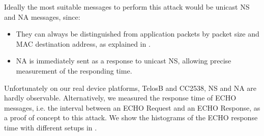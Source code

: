 Ideally the most suitable messages to perform this attack would be unicast NS and NA messages, since:
\begin{itemize}
	\item They can always be distinguished from application packets by packet size and MAC destination address, as explained in .
	\item NA is immediately sent as a response to unicast NS, allowing precise measurement of the responding time.
\end{itemize}

Unfortunately on our real device platforms, TelosB and CC2538, NS and NA are hardly observable. Alternatively, we measured the response time of ECHO messages, i.e. the interval between an ECHO Request and an ECHO Response, as a proof of concept to this attack.  We show the histograms of the ECHO response time with different setups in .

